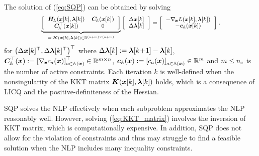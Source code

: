 \documentclass[journal]{IEEEtranTIE}
\begin{document}
The solution of (\ref{eq:SQP}) can be obtained by solving 
%
\begin{align}\label{eq:KKT_matrix}
{\scriptsize
\underbrace{\left[ \begin{array}{*{20}{c}}
\mm{H}_{\!L}(\mv{x}[k],\mv{\lambda}[k])& \mm{C}_{\!\mathbb{A}}(\mv{x}[k])\\
\mm{C}^\top_{\!\mathbb{A}}(\mv{x}[k])&0
\end{array} \right]}_{=:\mm{K}(\mv{x}[k],\mv{\lambda}[k]) \in \R^{(n+m) \times (n+m)}}\left[ \begin{array}{*{20}{c}}
\Delta\mv{x}[k]\\
\Delta\mv{\lambda}[k]
\end{array} \right] = \left[ \begin{array}{*{20}{c}}
 - \nabla_{\!\mv{x}}L(\mv{x}[k],\mv{\lambda}[k])\\
 - \mv{c}_{\mathbb{A}}(\mv{x}[k])
\end{array} \right],
}
\end{align}
for $\big(\Delta\boldsymbol{x}[k]^\top, \Delta\boldsymbol{\lambda}[k]^\top\big)^\top$ where $\Delta\boldsymbol{\lambda}[k] := \boldsymbol{\lambda}[k\!+\!1] - \boldsymbol{\lambda}[k]$,  $\boldsymbol{C}_{\!\mathbb{A}}^\top(\boldsymbol{x}) := \left[ {\nabla_{\!\boldsymbol{x}} {c_a}(\boldsymbol{x})} \right]^\top_ {a \in \mathbb{A}(\boldsymbol{x})} \in \mathbb{R}^{m \times n}$, $\boldsymbol{c}_{\mathbb{A}}(\boldsymbol{x}) := {\left[ {{c_a}(\boldsymbol{x})} \right]_{a \in \mathbb{A}(\boldsymbol{x})}} \in\mathbb{R}^m$ and  $m \leq n_{\rm c}$ is the number of active constraints. Each iteration $k$ is well-defined when the nonsingularity of the KKT matrix $\boldsymbol{K}(\boldsymbol{x}[k],\boldsymbol{\lambda}[k])$ holds, which is a consequence of LICQ and the positive-definiteness of the Hessian.

SQP solves the NLP effectively when each subproblem approximates the NLP reasonably well. However, solving (\ref{eq:KKT_matrix}) involves the inversion of KKT matrix, which is computationally expensive. In addition, SQP does not allow for the violation of constraints and thus may struggle to find a feasible solution when the NLP includes many inequality constraints.
\end{document}
